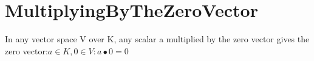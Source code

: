 \section{MultiplyingByTheZeroVector}

\begin{theorem}
  \label{theorem : smul_zero}
  \leanok
  In any vector space V over K, any scalar a multiplied by the zero vector gives the zero vector:$ a \in K, 0 \in V : a \bullet 0 = 0$
\end{theorem}
